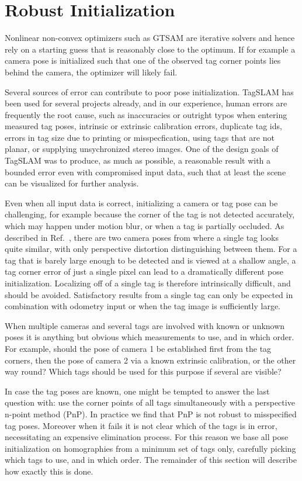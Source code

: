 \section{Robust Initialization}
\label{sec:robustinit}
Nonlinear non-convex optimizers such as GTSAM \cite{kaess2011} are
iterative solvers and hence rely on a starting guess that is
reasonably close to the optimum. If for example a camera pose is
initialized such that one of the observed tag corner points lies
behind the camera, the optimizer will likely fail.

Several sources of error can contribute to poor pose
initialization. TagSLAM has been used for several projects already,
and in our experience, human errors are frequently the root cause,
such as inaccuracies or outright typos when entering measured tag
poses, intrinsic or extrinsic calibration errors, duplicate tag ids,
errors in tag size due to printing or misspecfication, using tags that
are not planar, or supplying unsychronized stereo images. One of the
design goals of TagSLAM was to produce, as much as possible, a
reasonable result with a bounded error even with compromised input
data, such that at least the scene can be visualized for further
analysis.

Even when all input data is correct, initializing a camera or tag pose
can be challenging, for example because the corner of the tag is not
detected accurately, which may happen under motion blur, or when a tag
is partially occluded.  As described in Ref.\ \cite{jin2017}, there
are two camera poses from where a single tag looks quite similar, with
only perspective distortion distinguishing between them. For a tag
that is barely large enough to be detected and is viewed at a shallow
angle, a tag corner error of just a single pixel can lead to a
dramatically different pose initialization. Localizing off of a single
tag is therefore intrinsically difficult, and should be
avoided. Satisfactory results from a single tag can only be expected
in combination with odometry input or when the tag image is
sufficiently large.

When multiple cameras and several tags are involved with known or
unknown poses it is anything but obvious which measurements to use,
and in which order.  For example, should the pose of camera 1 be
established first from the tag corners, then the pose of camera 2 via
a known extrinsic calibration, or the other way round? Which tags
should be used for this purpose if several are visible?

In case the tag poses are known, one might be tempted to answer the
last question with: use the corner points of all tags simultaneously
with a perspective n-point method \cite{fischler1981} (PnP). In
practice we find that PnP is not robust to misspecified tag
poses. Moreover when it fails it is not clear which of the tags is in
error, necessitating an expensive elimination process. For this reason
we base all pose initialization on homographies \cite{ma2003} from a
minimum set of tags only, carefully picking which tags to use, and in
which order. The remainder of this section will describe how exactly
this is done.

